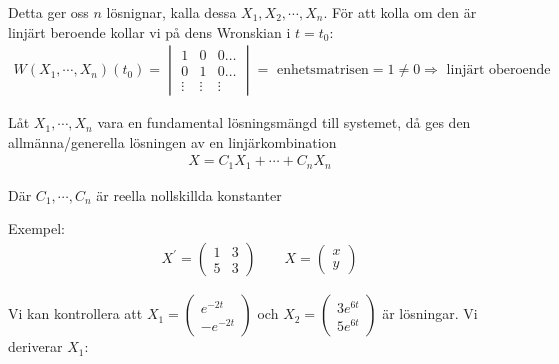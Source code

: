 \noindent Detta ger oss $n$ lösnignar, kalla dessa $X_1,X_2,\cdots, X_n$. För att kolla om den är linjärt beroende kollar vi på dens Wronskian i $t=t_0$:
\begin{equation*}
  \begin{gathered}
    W(X_1,\cdots, X_n)(t_0) = \begin{vmatrix}1&0&0\hdots\\0&1&0\hdots\\\vdots&\vdots&\vdots\end{vmatrix} = \text{ enhetsmatrisen} = 1\neq0 \Rightarrow \text{ linjärt oberoende}
  \end{gathered}
\end{equation*}
\par\bigskip
\begin{theo}
  Låt $X_1,\cdots, X_n$ vara en fundamental lösningsmängd till systemet, då ges den allmänna/generella lösningen av en linjärkombination
  \begin{equation*}
    \begin{gathered}
      X = C_1X_1+\cdots+C_nX_n
    \end{gathered}
  \end{equation*}\par
  \noindent Där $C_1,\cdots, C_n$ är reella nollskillda konstanter
\end{theo}
\par\bigskip
\noindent Exempel:
\begin{equation*}
  \begin{gathered}
    X^{\prime} = \begin{pmatrix}1&3\\5&3\end{pmatrix}\qquad X = \begin{pmatrix}x\\y\end{pmatrix}
  \end{gathered}
\end{equation*}\par
\noindent Vi kan kontrollera att $X_1 = \begin{pmatrix}e^{-2t}\\-e^{-2t}\end{pmatrix}$ och $X_2 = \begin{pmatrix}3e^{6t}\\5e^{6t}\end{pmatrix}$ är lösningar. Vi deriverar $X_1$:

